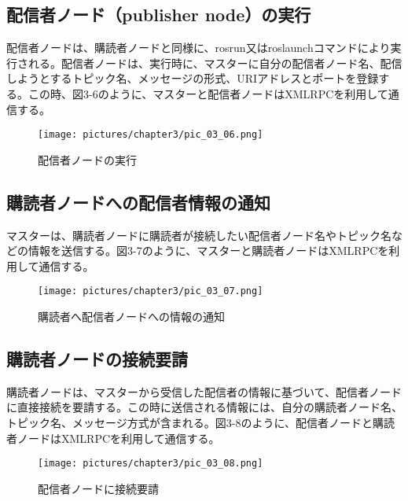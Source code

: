 \subsection{配信者ノード（publisher node）の実行}

配信者ノードは、購読者ノードと同様に、rosrun又はroslaunchコマンドにより実行される。配信者ノードは、実行時に、マスターに自分の配信者ノード名、配信しようとするトピック名、メッセージの形式、URIアドレスとポートを登録する。この時、図3-6のように、マスターと配信者ノードはXMLRPCを利用して通信する。

\begin{figure}[h]
  \centering
  \texttt{[image: pictures/chapter3/pic\_03\_06.png]}
  \caption{配信者ノードの実行}
\end{figure}

\subsection{購読者ノードへの配信者情報の通知}

マスターは、購読者ノードに購読者が接続したい配信者ノード名やトピック名などの情報を送信する。図3-7のように、マスターと購読者ノードはXMLRPCを利用して通信する。

\begin{figure}[h]
  \centering
  \texttt{[image: pictures/chapter3/pic\_03\_07.png]}
  \caption{購読者へ配信者ノードへの情報の通知}
\end{figure}

\subsection{購読者ノードの接続要請}

購読者ノードは、マスターから受信した配信者の情報に基づいて、配信者ノードに直接接続を要請する。この時に送信される情報には、自分の購読者ノード名、トピック名、メッセージ方式が含まれる。図3-8のように、配信者ノードと購読者ノードはXMLRPCを利用して通信する。

\begin{figure}[h]
  \centering
  \texttt{[image: pictures/chapter3/pic\_03\_08.png]}
  \caption{配信者ノードに接続要請}
\end{figure}


